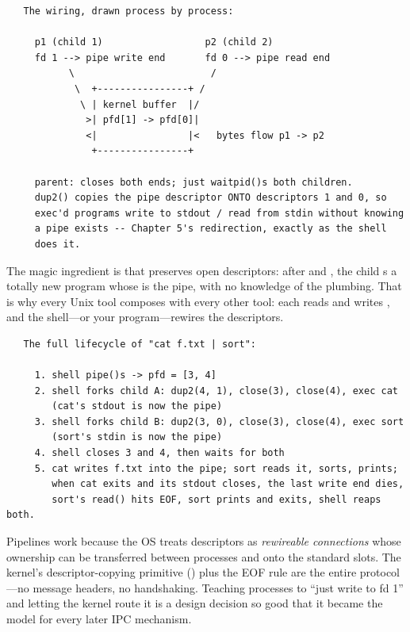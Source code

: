\begin{verbatim}
   The wiring, drawn process by process:

     p1 (child 1)                  p2 (child 2)
     fd 1 --> pipe write end       fd 0 --> pipe read end
           \                        /
            \  +----------------+ /
             \ | kernel buffer  |/
              >| pfd[1] -> pfd[0]|
              <|                |<   bytes flow p1 -> p2
               +----------------+

     parent: closes both ends; just waitpid()s both children.
     dup2() copies the pipe descriptor ONTO descriptors 1 and 0, so
     exec'd programs write to stdout / read from stdin without knowing
     a pipe exists -- Chapter 5's redirection, exactly as the shell
     does it.
\end{verbatim}

The magic ingredient is that  preserves open descriptors:
after  and , the child s a totally
new program whose  is the pipe, with no knowledge of the
plumbing. That is why every Unix tool composes with every other tool:
each reads  and writes , and the shell---or
your program---rewires the descriptors.

\begin{verbatim}
   The full lifecycle of "cat f.txt | sort":

     1. shell pipe()s -> pfd = [3, 4]
     2. shell forks child A: dup2(4, 1), close(3), close(4), exec cat
        (cat's stdout is now the pipe)
     3. shell forks child B: dup2(3, 0), close(3), close(4), exec sort
        (sort's stdin is now the pipe)
     4. shell closes 3 and 4, then waits for both
     5. cat writes f.txt into the pipe; sort reads it, sorts, prints;
        when cat exits and its stdout closes, the last write end dies,
        sort's read() hits EOF, sort prints and exits, shell reaps both.
\end{verbatim}

\begin{osconcept}
Pipelines work because the OS treats descriptors as \emph{rewireable
connections} whose ownership can be transferred between processes and
onto the standard slots. The kernel's descriptor-copying primitive
() plus the EOF rule are the entire protocol---no message
headers, no handshaking. Teaching processes to ``just write to fd 1''
and letting the kernel route it is a design decision so good that it
became the model for every later IPC mechanism.
\end{osconcept}

